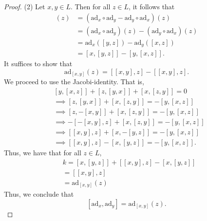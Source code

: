 \documentclass[a4paper]{article}
\begin{document}
\begin{enumerate}
\begin{proof}
    (2) Let \( x,y \in L  \). Then for all \( z \in L  \), it follows that 
    \begin{align*}
        [\text{ad}_x , \text{ad}_y  ](z) &= (\text{ad}_x \circ \text{ad}_y - \text{ad}_y  \circ \text{ad}_x    )(z) \\
                                         &= (\text{ad}_x \circ \text{ad}_y  )(z) - (\text{ad}_y \circ \text{ad}_x)(z) \\
                                         &= \text{ad}_x([y,z]) - \text{ad}_y([x,z]) \\  
                                         &= [x,[y,z]] - [y,[x,z]].
    \end{align*}
    It suffices to show that 
    \[  \text{ad}_{[x,y]}(z) =   [[x,y], z] - [[x,y], z ]. \]
    We proceed to use the Jacobi-identity. That is,
    \begin{align*}
        &[y,[x,z]] + [z,[y,x]] + [x,[z,y]] = 0  \\
        &\implies [z,[y,x]] + [x,[z,y]] = - [y,[x,z]] \\
        &\implies [z, -[x,y]] + [x, [z,y]] = - [y,[x,z]] \\
        &\implies -[-[x,y], z] + [x,[z,y]] = - [y, [x,z]] \\
        &\implies [[x,y],z] + [x, - [y,z]] = - [ y, [x,z]] \\
        &\implies [[x,y], z] - [x, [y,z]] = -[y, [x,z]].
    \end{align*}
    Thus, we have that for all \( z \in L  \), 
    \begin{align*}
        [\text{ad}_x, \text{ad}_y] &k= [x, [y,z]] + [[x,y], z] - [x, [y,z]] \\
                                   &= [[x,y],z]   \\
                                   &= \text{ad}_{[x,y]}(z) 
    \end{align*}
    Thus, we conclude that 
    \[ [\text{ad}_x , \text{ad}_y   ] = \text{ad}_{[x,y]}(z).  \]
    



    \end{proof}
\end{enumerate}
\end{document}
